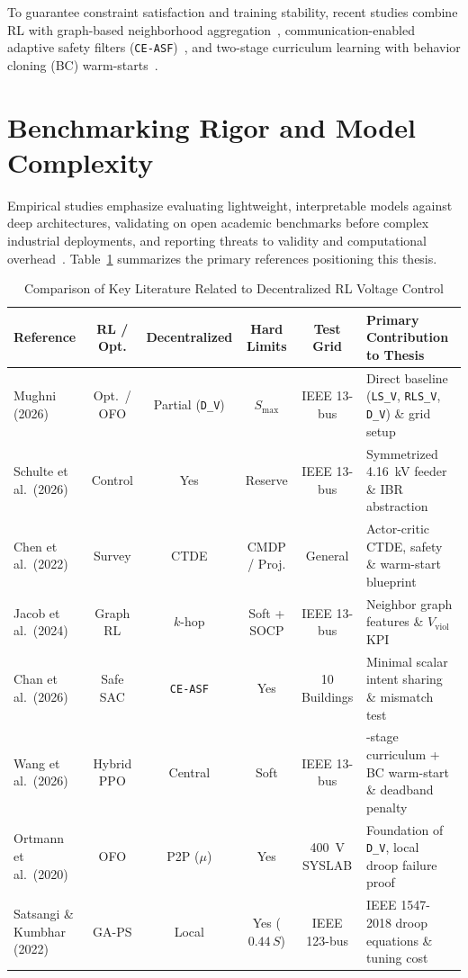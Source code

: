 To guarantee constraint satisfaction and training stability, recent studies combine RL with graph-based neighborhood aggregation~\cite{Jacob2024}, communication-enabled adaptive safety filters (\texttt{CE-ASF})~\cite{Chan2026}, and two-stage curriculum learning with behavior cloning (BC) warm-starts~\cite{Wang2026}.

\section{Benchmarking Rigor and Model Complexity}
Empirical studies emphasize evaluating lightweight, interpretable models against deep architectures, validating on open academic benchmarks before complex industrial deployments, and reporting threats to validity and computational overhead~\cite{Stradowski2023}. Table~\ref{tab:lit_comparison} summarizes the primary references positioning this thesis.

\begin{table}[!htbp]
\centering
\caption{Comparison of Key Literature Related to Decentralized RL Voltage Control}
\label{tab:lit_comparison}
\footnotesize
\renewcommand{\arraystretch}{1.12}
\begin{tabularx}{\textwidth}{lcccc >{\raggedright\arraybackslash}X}
\toprule
\textbf{Reference} & \textbf{RL / Opt.} & \textbf{Decentralized} & \textbf{Hard Limits} & \textbf{Test Grid} & \textbf{Primary Contribution to Thesis} \\
\midrule
Mughni (2026)~\cite{Mughni2026} & Opt.\ / OFO & Partial (\texttt{D\_V}) & $S_{\max}$ & IEEE 13-bus & Direct baseline (\texttt{LS\_V}, \texttt{RLS\_V}, \texttt{D\_V}) \& grid setup \\
Schulte et al.\ (2026)~\cite{Schulte2026} & Control & Yes & Reserve & IEEE 13-bus & Symmetrized 4.16~kV feeder \& IBR abstraction \\
Chen et al.\ (2022)~\cite{Chen2022} & Survey & CTDE & CMDP / Proj. & General & Actor-critic CTDE, safety \& warm-start blueprint \\
Jacob et al.\ (2024)~\cite{Jacob2024} & Graph RL & $k$-hop & Soft + SOCP & IEEE 13-bus & Neighbor graph features \& $V_{\text{viol}}$ KPI \\
Chan et al.\ (2026)~\cite{Chan2026} & Safe SAC & \texttt{CE-ASF} & Yes & 10 Buildings & Minimal scalar intent sharing \& mismatch test \\
Wang et al.\ (2026)~\cite{Wang2026} & Hybrid PPO & Central & Soft & IEEE 13-bus & 2-stage curriculum + BC warm-start \& deadband penalty \\
Ortmann et al.\ (2020)~\cite{Ortmann2020} & OFO & P2P ($\mu$) & Yes & 400~V SYSLAB & Foundation of \texttt{D\_V}, local droop failure proof \\
Satsangi \& Kumbhar (2022)~\cite{Satsangi2022} & GA-PS & Local & Yes ($0.44\,S$) & IEEE 123-bus & IEEE 1547-2018 droop equations \& tuning cost \\
\bottomrule
\end{tabularx}
\end{table}

